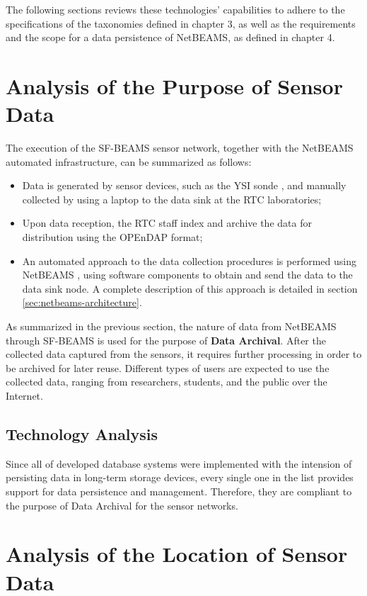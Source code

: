 The following sections reviews these technologies' capabilities to adhere to
the specifications of the taxonomies defined in chapter 3, as well as the
requirements and the scope for a data persistence of NetBEAMS, as defined in
chapter 4.

\section{Analysis of the Purpose of Sensor Data}

The execution of the SF-BEAMS sensor network, together with the NetBEAMS
automated infrastructure, can be summarized as follows:

\begin{itemize}
  \item Data is generated by sensor devices, such as the YSI sonde
  \cite{YSI-Sonde}, and manually collected by using a laptop to the data sink
  at the RTC laboratories;
  \item Upon data reception, the RTC staff index and archive the data for
  distribution using the OPEnDAP format;
  \item An automated approach to the data collection procedures is performed 
  using NetBEAMS \cite{netbeams2009}, using software components to obtain and
  send the data to the data sink node. A complete description of this approach
  is detailed in section \ref{sec:netbeams-architecture}.
\end{itemize}

As summarized in the previous section, the nature of data from NetBEAMS through
SF-BEAMS is used for the purpose of \textbf{Data Archival}. After the
collected data captured from the sensors, it requires further processing
in order to be archived for later reuse. Different types of users are expected
to use the collected data, ranging from researchers, students, and the public 
over the Internet.

\subsection{Technology Analysis}

Since all of developed database systems were implemented with the intension of
persisting data in long-term storage devices, every single one in the list
provides support for data persistence and management. Therefore, they are
compliant to the purpose of Data Archival for the sensor networks.

\section{Analysis of the Location of Sensor Data}
\label{sec:sn-data-location}

